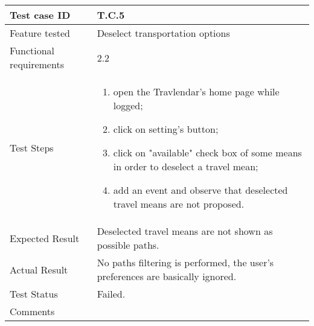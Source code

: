 \begin{table}[H]
	\begin{center}
		\begin{tabular}{ | p{} | p{} | }
		\hline
		Test case ID & T.C.5\\
		\hline
		Feature tested & Deselect transportation options  \\
		\hline
		Functional requirements & 2.2   \\
		\hline
		Test Steps & 
			\begin{enumerate}
				\item open the Travlendar's home page while logged;
				\item click on setting's button;
				\item click on "available" check box of some means in order to deselect a travel mean;
				\item add an event and observe that deselected travel means are not proposed.
			\end{enumerate} \\
		\hline
		Expected Result & Deselected travel means are not shown as possible paths.\\
		\hline
		Actual Result & No paths filtering is performed, the user's preferences are basically ignored.\\ 
		\hline
		Test Status & \color{Red}Failed.\\ 
		\hline
		Comments &\\ 
		\hline
		\end{tabular}
	\end{center}
\end{table}

